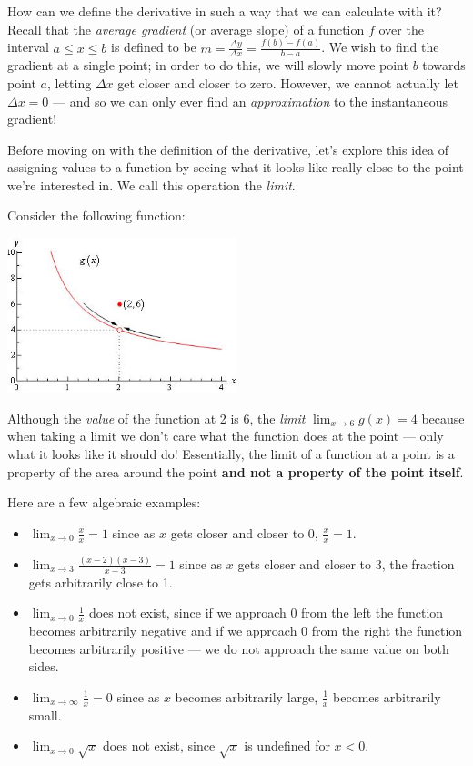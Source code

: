 



How can we define the derivative in such a way that we can calculate with it? Recall that the \textit{average gradient} (or average slope) of
a function $ f $ over the interval $ a \leq x \leq b $ is defined to be $ m = \frac{\Delta y}{\Delta x} = \frac{f(b) - f(a)}{b - a} $. We wish
to find the gradient at a single point; in order to do this, we will slowly move point $ b $ towards point $ a $, letting $ \Delta x $ get closer
and closer to zero. However, we cannot actually let $ \Delta x = 0 $ --- and so we can only ever find an \textit{approximation} to the instantaneous
gradient!

Before moving on with the definition of the derivative, let's explore this idea of assigning values to a function by seeing what it looks like
really close to the point we're interested in. We call this operation the \textit{limit}.

Consider the following function:
\begin{center}
  \includegraphics[width=0.5\textwidth]{oslimit2}
\end{center}
Although the \textit{value} of the function at 2 is 6, the \textit{limit} $ \lim_{x \to 6} g(x) = 4 $ because when
taking a limit we don't care what the function does at the point --- only what it looks like it should do! Essentially, the
limit of a function at a point is a property of the area around the point \textbf{and not a property of the point itself}.

\begin{ex}
  Here are a few algebraic examples:
  \begin{itemize}
    \item $ \lim_{x \to 0} \frac{x}{x} = 1 $ since as $ x $ gets closer and closer to $ 0 $, $ \frac{x}{x} = 1 $.
    \item $ \lim_{x \to 3} \frac{(x - 2)(x - 3)}{x - 3} = 1 $ since as $ x $ gets closer and closer to 3, the fraction gets arbitrarily close to 1.
    \item $ \lim_{x \to 0} \frac{1}{x} $ does not exist, since if we approach 0 from the left the function becomes arbitrarily negative
          and if we approach 0 from the right the function becomes arbitrarily positive --- we do not approach the same value on both sides.
    \item $ \lim_{x \to \infty} \frac{1}{x} = 0 $ since as $ x $ becomes arbitrarily large, $ \frac{1}{x} $ becomes arbitrarily small.
    \item $ \lim_{x \to 0} \sqrt{x} $ does not exist, since $ \sqrt{x} $ is undefined for $ x < 0 $.
  \end{itemize}
\end{ex}

